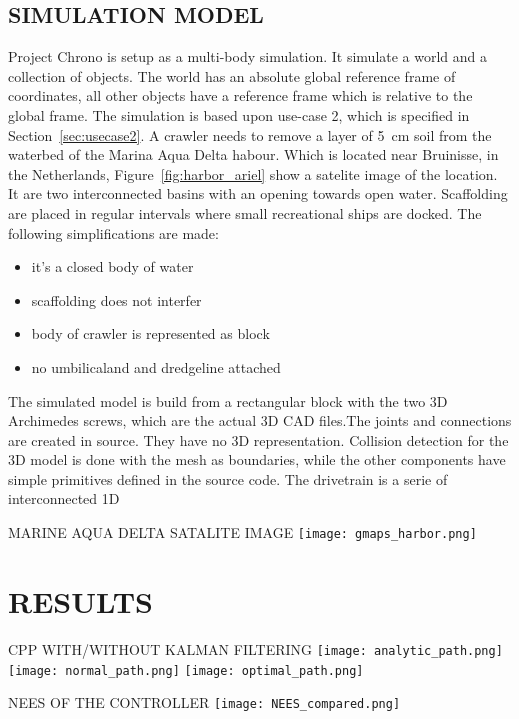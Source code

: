 \subsection{SIMULATION MODEL}\label{sec:simulation model}

Project Chrono is setup as a multi-body simulation. It simulate a world and a collection of objects. The world has an
absolute global reference frame of coordinates, all other objects have a reference frame which is relative to the global
frame. The simulation is based upon use-case 2, which is specified in Section~\ref{sec:usecase2}. A crawler needs to
remove a layer of \SI{5}{\centi\metre} soil from the waterbed of the Marina Aqua Delta habour. Which is located near
Bruinisse, in the Netherlands, Figure~\ref{fig:harbor_ariel} show a satelite image of the location. It are two
interconnected basins with an opening towards open water. Scaffolding are placed in regular intervals where small
recreational ships are docked. The following simplifications are made:

\begin{itemize}
    \setlength\itemsep{0mm}
    \item it's a closed body of water
    \item scaffolding does not interfer
    \item body of crawler is represented as block
    \item no umbilicaland and dredgeline attached
\end{itemize}

The simulated model is build from a rectangular block with the two 3D Archimedes screws, which are the actual 3D CAD files.The joints and connections are created in source. They have no 3D representation. Collision detection for the 3D model is done with the mesh as boundaries, while the other components have simple primitives defined in the source code.
The drivetrain is a serie of interconnected 1D

\begin{RoyalFigure}[htb, label=fig:harbor_ariel]{MARINE AQUA DELTA SATALITE IMAGE \cite{google_maps_marine_2005}}
    \texttt{[image: gmaps\_harbor.png]}
\end{RoyalFigure}


\section{RESULTS}\label{sec:results}

\begin{RoyalFigure}[htb, label=fig:coverage_wo_kalman]{CPP WITH/WITHOUT KALMAN FILTERING}
	\texttt{[image: analytic\_path.png]}
	\texttt{[image: normal\_path.png]}
	\texttt{[image: optimal\_path.png]}
\end{RoyalFigure}

\begin{RoyalFigure}[htb, label=fig:NEES_kalman]{NEES OF THE CONTROLLER}
	\texttt{[image: NEES\_compared.png]}
\end{RoyalFigure}
